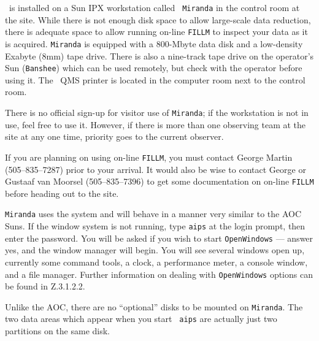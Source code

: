 

     \AIPS\ is installed on a Sun IPX workstation  called {\tt
Miranda} in the control room at the  site.  While there is
not enough disk space to allow large-scale data reduction, there is
adequate space to allow running on-line {\tt FILLM} to inspect your
data as it is acquired.  {\tt Miranda} is equipped with a 800-Mbyte
data disk and a low-density Exabyte (8mm) tape drive.  There is also a
nine-track tape drive on the operator's Sun ({\tt Banshee}) which can
be used remotely, but check with the operator before using it.  The
\AIPS\ QMS printer is located in the computer room next to the control
room.



     There is no official sign-up for visitor use of {\tt Miranda}; if
the workstation is not in use, feel free to use it.  However, if there
is more than one observing team at the site at any one time, priority
goes to the current observer.

     If you are planning on using on-line {\tt FILLM}, you must
contact George Martin (505--835--7287) prior to your arrival.  It
would also be wise to contact George or Gustaaf van Moorsel
(505--835--7396) to get some documentation on on-line {\tt FILLM}
before heading out to the site.

\vfill\eject
{}

    {\tt Miranda} uses the {\tt {}} system and will
behave in a manner very similar to the AOC Suns.  If the window system
is not running, type {\tt aips} at the login prompt, then enter the
password. You will be asked if you wish to start {\tt OpenWindows} ---
answer yes, and the window manager will begin.  You will see several
windows open up, currently some command tools, a clock, a performance
meter, a console window, and a file manager.  Further information on
dealing with {\tt OpenWindows} options can be found in \Sec Z.3.1.2.2.


     Unlike the AOC, there are no ``optional'' disks to be mounted on
{\tt Miranda}.  The two data areas which appear when you start {\tt
aips} are actually just two partitions on the same disk.

